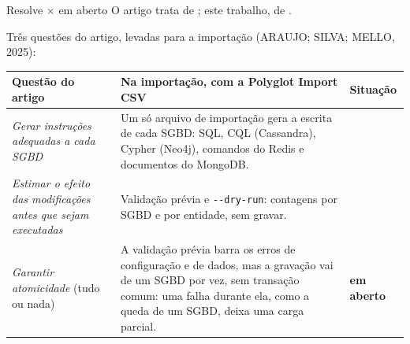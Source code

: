 \newcommand{\cmaberto}{{\color{red!55!black}\bfseries em aberto}}
\begin{frame}{Resolve $\times$ em aberto}
  O artigo trata de ; este trabalho, de .\par
  Três questões do artigo, levadas para a importação (ARAUJO; SILVA; MELLO, 2025):\par
  \medskip
  \footnotesize
  \setlength{\tabcolsep}{3pt}
  \renewcommand{\arraystretch}{1.3}
  \begin{tabular}{@{}E{0.28\textwidth}E{0.53\textwidth}E{0.13\textwidth}@{}}
    \toprule
    \bfseries Questão do artigo & \bfseries Na importação, com a Polyglot Import CSV
      & \bfseries Situação \\
    \midrule
    \textit{Gerar instruções adequadas a cada SGBD}
      & Um só arquivo de importação gera a escrita de cada SGBD: SQL, CQL (Cassandra),
        Cypher (Neo4j), comandos do Redis e documentos do MongoDB.
      &  \\
    \textit{Estimar o efeito das modificações antes que sejam executadas}
      & Validação prévia e \texttt{-{}-dry-run}: contagens por SGBD e por entidade, sem
        gravar.
      &  \\
    \textit{Garantir atomicidade} (tudo ou nada)
      & A validação prévia barra os erros de configuração e de dados, mas a gravação vai de
        um SGBD por vez, sem transação comum: uma falha durante ela, como a queda de um
        SGBD, deixa uma carga parcial.
      & \cmaberto \\
    \bottomrule
  \end{tabular}
\end{frame}

